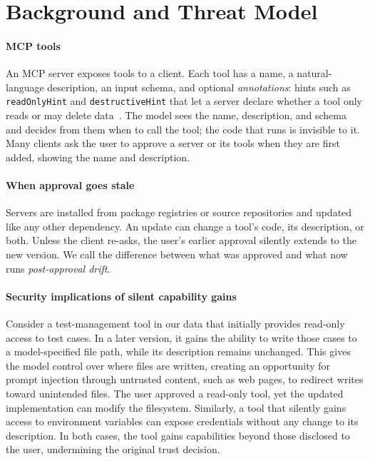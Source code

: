 \section{Background and Threat Model}\label{sec:background}

\paragraph{MCP tools}
An MCP server exposes tools to a client. Each tool has a name, a natural-language description, an input schema, and optional \emph{annotations}: hints such as \texttt{readOnlyHint} and \texttt{destructiveHint} that let a server declare whether a tool only reads or may delete data~\cite{mcpspec}. The model sees the name, description, and schema and decides from them when to call the tool; the code that runs is invisible to it. Many clients ask the user to approve a server or its tools when they are first added, showing the name and description.

\paragraph{When approval goes stale}
Servers are installed from package registries or source repositories and updated like any other dependency. An update can change a tool's code, its description, or both. Unless the client re-asks, the user's earlier approval silently extends to the new version. We call the difference between what was approved and what now runs \emph{post-approval drift}.

\paragraph{Security implications of silent capability gains}
Consider a test-management tool in our data that initially provides read-only access to test cases. In a later version, it gains the ability to write those cases to a model-specified file path, while its description remains unchanged. This gives the model control over where files are written, creating an opportunity for prompt injection through untrusted content, such as web pages, to redirect writes toward unintended files. The user approved a read-only tool, yet the updated implementation can modify the filesystem. Similarly, a tool that silently gains access to environment variables can expose credentials without any change to its description. In both cases, the tool gains capabilities beyond those disclosed to the user, undermining the original trust decision.

